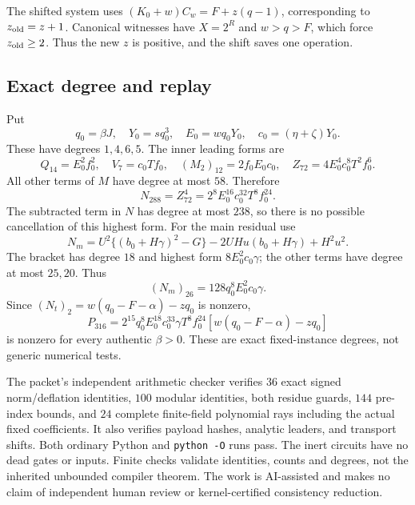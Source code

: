 The shifted system uses $(K_0+w)C_w=F+z(q-1)$, corresponding to
$z_{\rm old}=z+1$. Canonical witnesses have $X=2^R$ and
$w>q>F$, which force $z_{\rm old}\ge2$. Thus the new $z$ is positive,
and the shift saves one operation.

\subsection{Exact degree and replay}
Put
\[
 q_0=\beta J,\quad Y_0=sq_0^3,\quad E_0=wq_0Y_0,
 \quad c_0=(\eta+\zeta)Y_0.
\]
These have degrees $1,4,6,5$. The inner leading forms are
\[
 Q_{14}=E_0^2f_0^2,\quad V_7=c_0Tf_0,\quad
 (M_2)_{12}=2f_0E_0c_0,\quad Z_{72}=4E_0^4c_0^8T^2f_0^6.
\]
All other terms of $M$ have degree at most $58$. Therefore
\[
 N_{288}=Z_{72}^4=2^8E_0^{16}c_0^{32}T^8f_0^{24}.
\]
The subtracted term in $N$ has degree at most $238$, so there is no
possible cancellation of this highest form.
For the main residual use
\[
 N_m=U^2\{(b_0+H\gamma)^2-G\}
      -2UHu(b_0+H\gamma)+H^2u^2.
\]
The bracket has degree $18$ and highest form $8E_0^2c_0\gamma$;
the other terms have degree at most $25,20$. Thus
\[
 (N_m)_{26}=128q_0^8E_0^2c_0\gamma.
\]
Since $(N_t)_2=w(q_0-F-\alpha)-zq_0$ is nonzero,
\[
 P_{316}=2^{15}q_0^8E_0^{18}c_0^{33}\gamma T^8f_0^{24}
             [w(q_0-F-\alpha)-zq_0]
\]
is nonzero for every authentic $\beta>0$. These are exact fixed-instance
degrees, not generic numerical tests.

The packet's independent arithmetic checker verifies $36$ exact signed
norm/deflation identities, $100$ modular identities, both residue guards,
$144$ pre-index bounds, and $24$ complete finite-field polynomial rays
including the actual fixed coefficients. It also verifies payload hashes,
analytic leaders, and transport shifts. Both ordinary Python and
\texttt{python -O} runs pass. The inert circuits have no dead gates or inputs.
Finite checks validate identities, counts and degrees, not the inherited
unbounded compiler theorem. The work is AI-assisted and makes no claim of
independent human review or kernel-certified consistency reduction.
